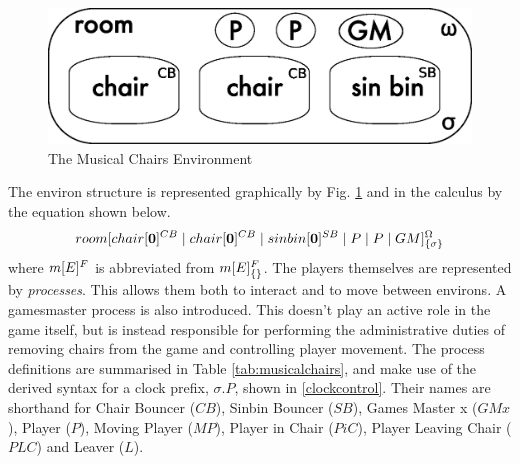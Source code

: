 \begin{figure}  
  \centering
  \includegraphics[scale=0.5]{gameenvbw}
  \caption{The Musical Chairs Environment}
  \label{fig:gameenv}
\end{figure}

The environ structure is represented graphically by Fig. \ref{fig:gameenv}
and in the calculus by the equation shown below.
\begin{equation}
{room}[ {chair}[ \textbf{0} ]^{CB} \;|\; {chair}[ \textbf{0} ]^{CB}
\;|\; {sinbin}[ \textbf{0} ]^{SB} \;|\; P \;|\; P \;|\; GM ]^{\Omega}_{\{\sigma\}}
\end{equation}
where ${m}[ E ]^{F}$ is abbreviated from ${m}[ E ]^{F}_{\{\}}$.  The
players themselves are represented by \emph{processes}.  This allows
them both to interact and to move between environs.  A gamesmaster
process is also introduced.  This doesn't play an active role in the
game itself, but is instead responsible for performing the
administrative duties of removing chairs from the game and controlling
player movement.  The process definitions are summarised in Table
\ref{tab:musicalchairs}, and make use of the derived syntax for a
clock prefix, $\sigma.P$, shown in \ref{clockcontrol}.  Their names
are shorthand for Chair Bouncer ($CB$), Sinbin Bouncer ($SB$), Games
Master x ($GMx$), Player ($P$), Moving Player ($MP$), Player in Chair
($PiC$), Player Leaving Chair ($PLC$) and Leaver ($L$).

